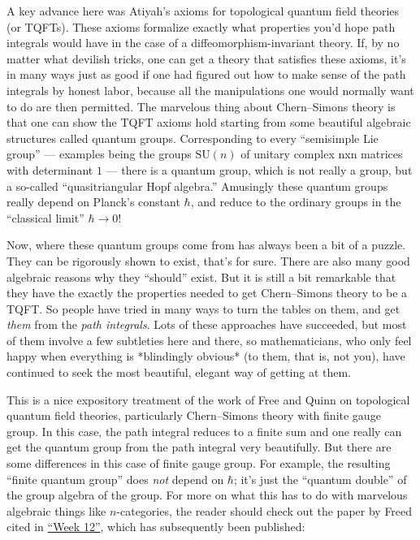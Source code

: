\documentclass{article}
\def\tightlist{}
\renewcommand{\texttt}[1]{%
  \begingroup
  \ttfamily
  \begingroup\lccode`~=`/\lowercase{\endgroup\def~}{/\discretionary{}{}{}}%
  \begingroup\lccode`~=`[\lowercase{\endgroup\def~}{[\discretionary{}{}{}}%
  \begingroup\lccode`~=`.\lowercase{\endgroup\def~}{.\discretionary{}{}{}}%
  \catcode`/=\active\catcode`[=\active\catcode`.=\active
  \scantokens{#1\noexpand}%
  \endgroup
}
\begin{document}
A key advance here was Atiyah's axioms for topological quantum field
theories (or TQFTs). These axioms formalize exactly what properties
you'd hope path integrals would have in the case of a
diffeomorphism-invariant theory. If, by no matter what devilish tricks,
one can get a theory that satisfies these axioms, it's in many ways just
as good if one had figured out how to make sense of the path integrals
by honest labor, because all the manipulations one would normally want
to do are then permitted. The marvelous thing about Chern--Simons theory
is that one can show the TQFT axioms hold starting from some beautiful
algebraic structures called quantum groups. Corresponding to every
``semisimple Lie group'' --- examples being the groups
\(\mathrm{SU}(n)\) of unitary complex nxn matrices with determinant
\(1\) --- there is a quantum group, which is not really a group, but a
so-called ``quasitriangular Hopf algebra.'' Amusingly these quantum
groups really depend on Planck's constant \(\hbar\), and reduce to the
ordinary groups in the ``classical limit'' \(\hbar \to 0\)!

Now, where these quantum groups come from has always been a bit of a
puzzle. They can be rigorously shown to exist, that's for sure. There
are also many good algebraic reasons why they ``should'' exist. But it
is still a bit remarkable that they have the exactly the properties
needed to get Chern--Simons theory to be a TQFT. So people have tried in
many ways to turn the tables on them, and get \emph{them} from the
\emph{path integrals}. Lots of these approaches have succeeded, but most
of them involve a few subtleties here and there, so mathematicians, who
only feel happy when everything is *blindingly obvious* (to them, that
is, not you), have continued to seek the most beautiful, elegant way of
getting at them.


This is a nice expository treatment of the work of Free and Quinn on
topological quantum field theories, particularly Chern--Simons theory
with finite gauge group. In this case, the path integral reduces to a
finite sum and one really can get the quantum group from the path
integral very beautifully. But there are some differences in this case
of finite gauge group. For example, the resulting ``finite quantum
group'' does \emph{not} depend on \(\hbar\); it's just the ``quantum
double'' of the group algebra of the group. For more on what this has to
do with marvelous algebraic things like \(n\)-categories, the reader
should check out the paper by Freed cited in
\protect\hyperlink{week12}{``Week 12''}, which has subsequently been
published:
\end{document}

